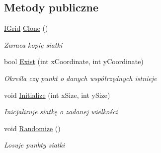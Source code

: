 \subsection*{Metody publiczne}
\begin{DoxyCompactItemize}
\item 
\hyperlink{interface_convay_1_1_core_1_1_interfaces_1_1_i_grid}{I\+Grid} \hyperlink{interface_convay_1_1_core_1_1_interfaces_1_1_i_grid_afb85615bea4fe14885fc2c36b16a9309}{Clone} ()
\begin{DoxyCompactList}\small\item\em Zwraca kopię siatki \end{DoxyCompactList}\item 
bool \hyperlink{interface_convay_1_1_core_1_1_interfaces_1_1_i_grid_a269281497dd5a218f1505d97b51d45b4}{Exist} (int x\+Coordinate, int y\+Coordinate)
\begin{DoxyCompactList}\small\item\em Określa czy punkt o danych współrzędnych istnieje \end{DoxyCompactList}\item 
void \hyperlink{interface_convay_1_1_core_1_1_interfaces_1_1_i_grid_a405c8dd71debf227ef90365d7fdf52b2}{Initialize} (int x\+Size, int y\+Size)
\begin{DoxyCompactList}\small\item\em Inicjalizuje siatkę o zadanej wielkości \end{DoxyCompactList}\item 
void \hyperlink{interface_convay_1_1_core_1_1_interfaces_1_1_i_grid_aee7beb6eae4302772adf85ecfc26b756}{Randomize} ()
\begin{DoxyCompactList}\small\item\em Losuje punkty siatki \end{DoxyCompactList}\end{DoxyCompactItemize}
